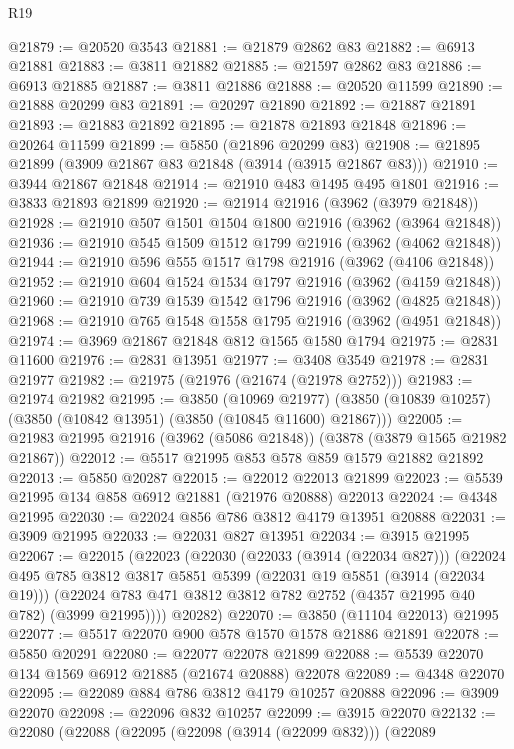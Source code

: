 \begin{lexlean}{R19}
\begin{coremodule}
@21879 := @20520 @3543
@21881 := @21879 @2862 @83
@21882 := @6913 @21881
@21883 := @3811 @21882
@21885 := @21597 @2862 @83
@21886 := @6913 @21885
@21887 := @3811 @21886
@21888 := @20520 @11599
@21890 := @21888 @20299 @83
@21891 := @20297 @21890
@21892 := @21887 @21891
@21893 := @21883 @21892
@21895 := @21878 @21893 @21848
@21896 := @20264 @11599
@21899 := @5850 (@21896 @20299 @83)
@21908 := @21895 @21899 (@3909 @21867 @83 @21848 (@3914 (@3915 @21867 @83)))
@21910 := @3944 @21867 @21848
@21914 := @21910 @483 @1495 @495 @1801
@21916 := @3833 @21893 @21899
@21920 := @21914 @21916 (@3962 (@3979 @21848))
@21928 := @21910 @507 @1501 @1504 @1800 @21916 (@3962 (@3964 @21848))
@21936 := @21910 @545 @1509 @1512 @1799 @21916 (@3962 (@4062 @21848))
@21944 := @21910 @596 @555 @1517 @1798 @21916 (@3962 (@4106 @21848))
@21952 := @21910 @604 @1524 @1534 @1797 @21916 (@3962 (@4159 @21848))
@21960 := @21910 @739 @1539 @1542 @1796 @21916 (@3962 (@4825 @21848))
@21968 := @21910 @765 @1548 @1558 @1795 @21916 (@3962 (@4951 @21848))
@21974 := @3969 @21867 @21848 @812 @1565 @1580 @1794
@21975 := @2831 @11600
@21976 := @2831 @13951
@21977 := @3408 @3549
@21978 := @2831 @21977
@21982 := @21975 (@21976 (@21674 (@21978 @2752)))
@21983 := @21974 @21982
@21995 := @3850
    (@10969 @21977)
    (@3850 (@10839 @10257) (@3850 (@10842 @13951) (@3850 (@10845 @11600) @21867)))
@22005 := @21983 @21995 @21916 (@3962 (@5086 @21848)) (@3878 (@3879 @1565 @21982 @21867))
@22012 := @5517 @21995 @853 @578 @859 @1579 @21882 @21892
@22013 := @5850 @20287
@22015 := @22012 @22013 @21899
@22023 := @5539 @21995 @134 @858 @6912 @21881 (@21976 @20888) @22013
@22024 := @4348 @21995
@22030 := @22024 @856 @786 @3812 @4179 @13951 @20888
@22031 := @3909 @21995
@22033 := @22031 @827 @13951
@22034 := @3915 @21995
@22067 := @22015
    (@22023
      (@22030
        (@22033 (@3914 (@22034 @827)))
        (@22024
          @495
          @785
          @3812
          @3817
          @5851
          @5399
          (@22031 @19 @5851 (@3914 (@22034 @19)))
          (@22024 @783 @471 @3812 @3812 @782 @2752 (@4357 @21995 @40 @782) (@3999 @21995))))
      @20282)
@22070 := @3850 (@11104 @22013) @21995
@22077 := @5517 @22070 @900 @578 @1570 @1578 @21886 @21891
@22078 := @5850 @20291
@22080 := @22077 @22078 @21899
@22088 := @5539 @22070 @134 @1569 @6912 @21885 (@21674 @20888) @22078
@22089 := @4348 @22070
@22095 := @22089 @884 @786 @3812 @4179 @10257 @20888
@22096 := @3909 @22070
@22098 := @22096 @832 @10257
@22099 := @3915 @22070
@22132 := @22080
    (@22088
      (@22095
        (@22098 (@3914 (@22099 @832)))
        (@22089

\end{coremodule}
\end{lexlean}
